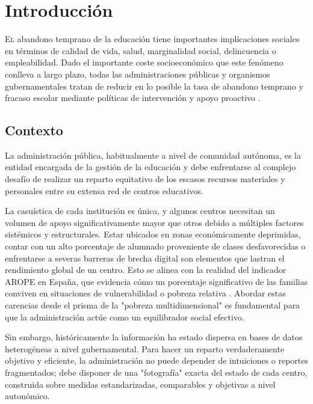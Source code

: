 \chapter{Introducción}
\label{chap:introduccion}

\lettrine{E}{l} abandono temprano de la educación tiene importantes implicaciones sociales en términos de calidad de vida, salud, marginalidad social, delincuencia o empleabilidad. Dado el importante coste socioeconómico que este fenómeno conlleva a largo plazo, todas las administraciones públicas y organismos gubernamentales tratan de reducir en lo posible la tasa de abandono temprano y fracaso escolar mediante políticas de intervención y apoyo proactivo \cite{OCDE_Educacion}.

\section{Contexto}

La administración pública, habitualmente a nivel de comunidad autónoma, es la entidad encargada de la gestión de la educación y debe enfrentarse al complejo desafío de realizar un reparto equitativo de los escasos recursos materiales y personales entre su extensa red de centros educativos. 

La casuística de cada institución es única, y algunos centros necesitan un volumen de apoyo significativamente mayor que otros debido a múltiples factores sistémicos y estructurales. Estar ubicados en zonas económicamente deprimidas, contar con un alto porcentaje de alumnado proveniente de clases desfavorecidas o enfrentarse a severas barreras de brecha digital son elementos que lastran el rendimiento global de un centro. Esto se alinea con la realidad del indicador AROPE en España, que evidencia cómo un porcentaje significativo de las familias conviven en situaciones de vulnerabilidad o pobreza relativa \cite{INE_Pobreza_PDF, AyudaEnAccion_Pobreza}. Abordar estas carencias desde el prisma de la "pobreza multidimensional" \cite{BBVA_Pobreza_Multidimensional, Observatorio_Pobreza} es fundamental para que la administración actúe como un equilibrador social efectivo.

Sin embargo, históricamente la información ha estado dispersa en bases de datos heterogéneas a nivel gubernamental. Para hacer un reparto verdaderamente objetivo y eficiente, la administración no puede depender de intuiciones o reportes fragmentados; debe disponer de una "fotografía" exacta del estado de cada centro, construida sobre medidas estandarizadas, comparables y objetivas a nivel autonómico.

